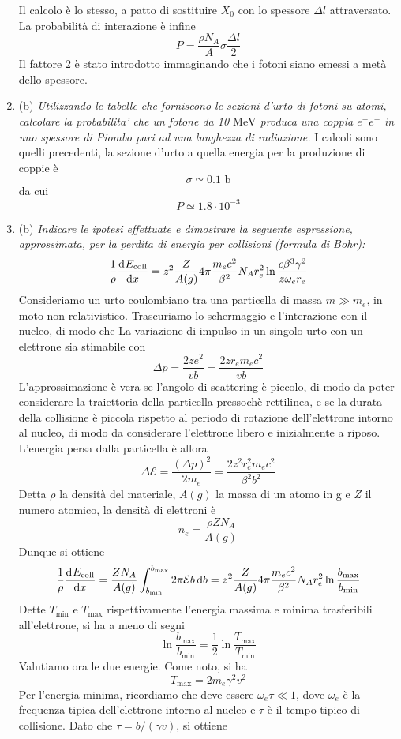 \documentclass{article}
\renewcommand{\b}{(b)}
\renewcommand{\t}[1]{\textit{ #1}}
\begin{document}
\begin{enumerate}
	Il calcolo è lo stesso, a patto di sostituire $X_0$ con lo spessore $\Delta l$ attraversato. La probabilità di interazione è infine
	\[P=\frac{\rho N_A}{A}\sigma\frac{\Delta l}{2}\]
	Il fattore 2 è stato introdotto immaginando che i fotoni siano emessi a metà dello spessore.
	\item\b\t{Utilizzando le tabelle che forniscono le sezioni d'urto di fotoni su atomi, calcolare
		la probabilita' che un fotone da 10 $\mathrm{MeV}$ produca una coppia $e^+e^-$ in uno spessore
		di Piombo pari ad una lunghezza di radiazione.} I calcoli sono quelli precedenti, la sezione d'urto a quella energia per la produzione di coppie è
	\[\sigma\simeq0.1\textrm{ b}\]
	da cui
	\[P\simeq1.8\cdot10^{-3}\]
	\item\b\t{Indicare le ipotesi effettuate e dimostrare la seguente espressione, approssimata,
		per la perdita di energia per collisioni (formula di Bohr):
		\[\frac{1}{\rho}\dfrac{\mathrm{d} ^{}E_\mathrm{coll}}{\mathrm{d} {x}^{}}=z^2\frac{Z}{A(g)}4\pi\frac{m_ec^2}{\beta^2}N_Ar_e^2\ln\frac{c\beta^3\gamma^2}{z\omega_er_e}\]
	} Consideriamo un urto coulombiano tra una particella di massa $m\gg m_e$, in moto non relativistico. Trascuriamo lo schermaggio e l'interazione con il nucleo, di modo che La variazione di impulso in un singolo urto con un elettrone sia stimabile con
\[\Delta p=\frac{2ze^2}{vb}=\frac{2zr_em_ec^2}{vb}\]
L'approssimazione è vera se l'angolo di scattering è piccolo, di modo da poter considerare la traiettoria della particella pressochè rettilinea, e se la durata della collisione è piccola rispetto al periodo di rotazione dell'elettrone intorno al nucleo, di modo da considerare l'elettrone libero e inizialmente a riposo. L'energia persa dalla particella è allora
\[\Delta\mathcal{E}=\frac{(\Delta p)^2}{2m_e}=\frac{2z^2r_e^2m_ec^2}{\beta^2b^2}\]
Detta $\rho$ la densità del materiale, $A(g)$ la massa di un atomo in g e $Z$ il numero atomico, la densità di elettroni è
\[n_e=\frac{\rho ZN_A}{A(g)}\]
Dunque si ottiene
\[\frac{1}{\rho}\dfrac{\mathrm{d} ^{}E_\textrm{coll}}{\mathrm{d} {x}^{}}=\frac{ZN_A}{A(g)}\int_{b_\textrm{min}}^{b_\textrm{max}}2\pi\mathcal{E}b\,\mathrm{d} b=z^2\frac{Z}{A(g)}4\pi\frac{m_ec^2}{\beta^2}N_Ar_e^2\ln\frac{b_\textrm{max}}{b_\textrm{min}}\]
Dette $T_\textrm{min}$ e $T_\textrm{max}$ rispettivamente l'energia massima e minima trasferibili all'elettrone, si ha a meno di segni
\[\ln\frac{b_\textrm{max}}{b_\textrm{min}}=\frac{1}{2}\ln\frac{T_\textrm{max}}{T_\textrm{min}}\]
Valutiamo ora le due energie. Come noto, si ha
\[T_\textrm{max}=2m_e\gamma^2v^2\]
Per l'energia minima, ricordiamo che deve essere $\omega_e\tau\ll1$, dove $\omega_e$ è la frequenza tipica dell'elettrone intorno al nucleo e $\tau$ è il tempo tipico di collisione. Dato che $\tau=b/(\gamma v)$, si ottiene

\end{enumerate}
\end{document}
